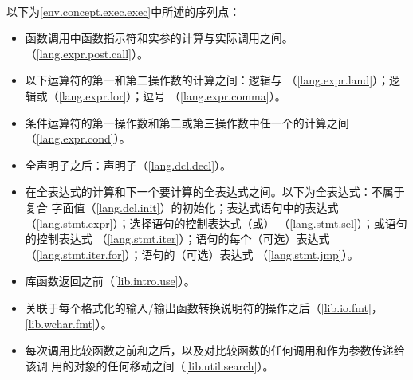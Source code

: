 
\paragraph{}
以下为\ref{env.concept.exec.exec}中所述的序列点：
\begin{itemize}
  \item{函数调用中函数指示符和实参的计算与实际调用之间。
    （\ref{lang.expr.post.call}）。}
  \item{以下运算符的第一和第二操作数的计算之间：逻辑与\tm{\&\&}
    （\ref{lang.expr.land}）；逻辑或\tm{||}（\ref{lang.expr.lor}）；逗号\tm{,}
    （\ref{lang.expr.comma}）。}
  \item{条件运算符的第一操作数和第二或第三操作数中任一个的计算之间
    （\ref{lang.expr.cond}）。}
  \item{全声明子之后：声明子（\ref{lang.dcl.decl}）。}
  \item{在全表达式的计算和下一个要计算的全表达式之间。以下为全表达式：不属于复合
    字面值（\ref{lang.dcl.init}）的初始化；表达式语句中的表达式
    （\ref{lang.stmt.expr}）；选择语句的控制表达式（或）
    （\ref{lang.stmt.sel}）；或语句的控制表达式
    （\ref{lang.stmt.iter}）；语句的每个（可选）表达式
    （\ref{lang.stmt.iter.for}）；语句的（可选）表达式
    （\ref{lang.stmt.jmp}）。}
  \item{库函数返回之前（\ref{lib.intro.use}）。}
  \item{关联于每个格式化的输入/输出函数转换说明符的操作之后（\ref{lib.io.fmt}，
    \ref{lib.wchar.fmt}）。}
  \item{每次调用比较函数之前和之后，以及对比较函数的任何调用和作为参数传递给该调
    用的对象的任何移动之间（\ref{lib.util.search}）。}
\end{itemize}
